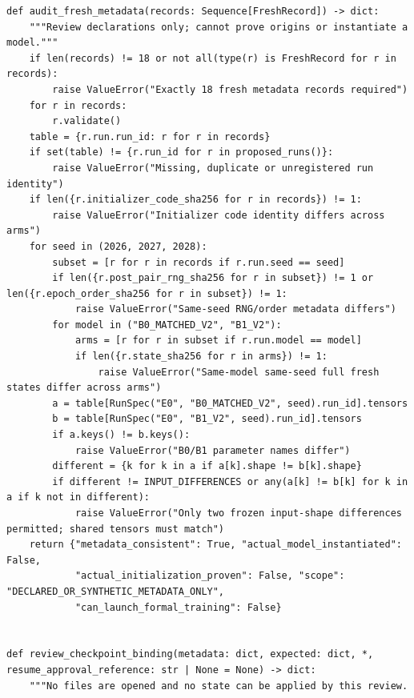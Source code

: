 \documentclass[UTF8,fontset=fandol,10pt]{ctexart}
\begin{document}
\begin{lstlisting}
def audit_fresh_metadata(records: Sequence[FreshRecord]) -> dict:
    """Review declarations only; cannot prove origins or instantiate a model."""
    if len(records) != 18 or not all(type(r) is FreshRecord for r in records):
        raise ValueError("Exactly 18 fresh metadata records required")
    for r in records:
        r.validate()
    table = {r.run.run_id: r for r in records}
    if set(table) != {r.run_id for r in proposed_runs()}:
        raise ValueError("Missing, duplicate or unregistered run identity")
    if len({r.initializer_code_sha256 for r in records}) != 1:
        raise ValueError("Initializer code identity differs across arms")
    for seed in (2026, 2027, 2028):
        subset = [r for r in records if r.run.seed == seed]
        if len({r.post_pair_rng_sha256 for r in subset}) != 1 or len({r.epoch_order_sha256 for r in subset}) != 1:
            raise ValueError("Same-seed RNG/order metadata differs")
        for model in ("B0_MATCHED_V2", "B1_V2"):
            arms = [r for r in subset if r.run.model == model]
            if len({r.state_sha256 for r in arms}) != 1:
                raise ValueError("Same-model same-seed full fresh states differ across arms")
        a = table[RunSpec("E0", "B0_MATCHED_V2", seed).run_id].tensors
        b = table[RunSpec("E0", "B1_V2", seed).run_id].tensors
        if a.keys() != b.keys():
            raise ValueError("B0/B1 parameter names differ")
        different = {k for k in a if a[k].shape != b[k].shape}
        if different != INPUT_DIFFERENCES or any(a[k] != b[k] for k in a if k not in different):
            raise ValueError("Only two frozen input-shape differences permitted; shared tensors must match")
    return {"metadata_consistent": True, "actual_model_instantiated": False,
            "actual_initialization_proven": False, "scope": "DECLARED_OR_SYNTHETIC_METADATA_ONLY",
            "can_launch_formal_training": False}


def review_checkpoint_binding(metadata: dict, expected: dict, *, resume_approval_reference: str | None = None) -> dict:
    """No files are opened and no state can be applied by this review.


\end{lstlisting}
\end{document}
